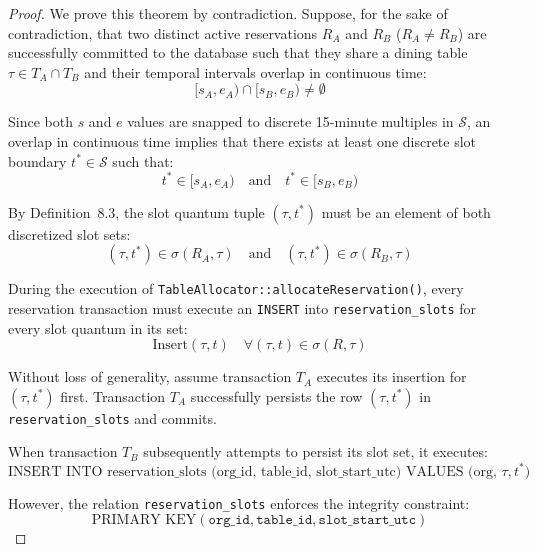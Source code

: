\begin{proof}
We prove this theorem by contradiction. Suppose, for the sake of contradiction, that two distinct active reservations $R_A$ and $R_B$ ($R_A \neq R_B$) are successfully committed to the database such that they share a dining table $\tau \in T_A \cap T_B$ and their temporal intervals overlap in continuous time:
\begin{equation}
    [s_A, e_A) \cap [s_B, e_B) \neq \emptyset
\end{equation}

Since both $s$ and $e$ values are snapped to discrete 15-minute multiples in $\mathcal{S}$, an overlap in continuous time implies that there exists at least one discrete slot boundary $t^* \in \mathcal{S}$ such that:
\begin{equation}
    t^* \in [s_A, e_A) \quad \text{and} \quad t^* \in [s_B, e_B)
\end{equation}

By Definition~8.3, the slot quantum tuple $(\tau, t^*)$ must be an element of both discretized slot sets:
\begin{equation}
    (\tau, t^*) \in \sigma(R_A, \tau) \quad \text{and} \quad (\tau, t^*) \in \sigma(R_B, \tau)
\end{equation}

During the execution of \texttt{TableAllocator::allocateReservation()}, every reservation transaction must execute an \texttt{INSERT} into \texttt{reservation\_slots} for every slot quantum in its set:
\begin{equation}
    \text{Insert}(\tau, t) \quad \forall (\tau, t) \in \sigma(R, \tau)
\end{equation}

Without loss of generality, assume transaction $T_A$ executes its insertion for $(\tau, t^*)$ first. Transaction $T_A$ successfully persists the row $(\tau, t^*)$ in \texttt{reservation\_slots} and commits.

When transaction $T_B$ subsequently attempts to persist its slot set, it executes:
\begin{equation}
    \text{INSERT INTO reservation\_slots (org\_id, table\_id, slot\_start\_utc) VALUES (org, } \tau, t^*)
\end{equation}

However, the relation \texttt{reservation\_slots} enforces the integrity constraint:
\begin{equation}
    \text{PRIMARY KEY} (\texttt{org\_id}, \texttt{table\_id}, \texttt{slot\_start\_utc})
\end{equation}


\end{proof}
